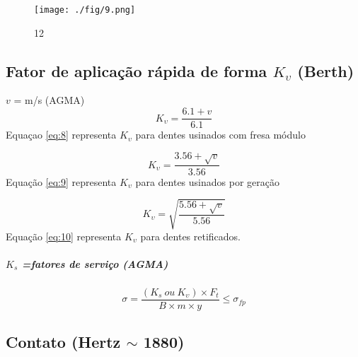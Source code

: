 \documentclass[a4paper, 12pt]{article}
\begin{document}
\begin{figure}[h]
\begin{center}
\texttt{[image: ./fig/9.png]}
\caption{\label{fig:12}12} 
\end{center}
\end{figure}

\subsection{Fator de aplicação rápida de forma $K_{\upsilon}$ (Berth)}
$v$ = m/s (AGMA)
\begin{equation}
K_{\upsilon}=\frac{6.1+v}{6.1}
\label{eq:8}
\end{equation}
Equaçao \ref{eq:8} representa $K_{\upsilon}$ para dentes usinados com fresa módulo

\begin{equation}
K_{\upsilon}=\frac{3.56+\sqrt{v}}{3.56}
\label{eq:9}
\end{equation}
Equação \ref{eq:9} representa $K_{\upsilon}$ para dentes usinados por geração

\begin{equation}
K_{\upsilon}=\sqrt{ \frac{5.56+\sqrt{v}}{5.56} }
\label{eq:10}
\end{equation}
Equação \ref{eq:10} representa $K_{\upsilon}$ para dentes retificados.

\subparagraph*{$K_{s}$  =fatores de serviço (AGMA)}
\[\sigma = \frac{(K_{s}\ ou\ K_{\upsilon}) \times F_{t}}{B \times m \times y} \leqslant \sigma _{fp}\]

\subsection{Contato (Hertz $\sim$ 1880)}
\end{document}
